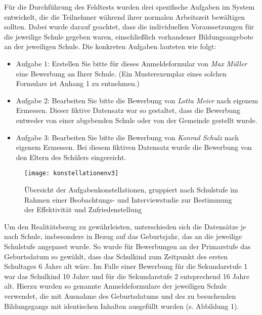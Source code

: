 Für die Durchführung des Feldtests wurden drei spezifische Aufgaben im System entwickelt, die die Teilnehmer während ihrer normalen Arbeitszeit bewältigen sollten. Dabei wurde darauf geachtet, dass die individuellen  Voraussetzungen für die jeweilige Schule gegeben waren, einschließlich  vorhandener Bildungsangebote an der jeweiligen Schule. Die konkreten Aufgaben lauteten wie folgt:

\begin{itemize}
\item Aufgabe 1: \glqq Erstellen Sie bitte für dieses Anmeldeformular von \textit{Max Müller} eine Bewerbung an Ihrer Schule.\grqq{} (Ein Musterexemplar eines solchen Formulars ist Anhang 1 zu entnehmen.)
\item Aufgabe 2: \glqq Bearbeiten Sie bitte die Bewerbung von \textit{Lotta Meier} nach eigenem Ermessen.\grqq{}  Dieser fiktive Datensatz war so gestaltet, dass die Bewerbung entweder von einer abgebenden Schule oder von der Gemeinde gestellt wurde.
\item Aufgabe 3: \glqq Bearbeiten Sie bitte die Bewerbung von \textit{Konrad Schulz} nach eigenem Ermessen.\grqq{}  Bei diesem fiktiven Datensatz wurde die Bewerbung von den Eltern des Schülers eingereicht.
\end{itemize}

\begin{figure}[H]
    \caption{Übersicht der Aufgabenkonstellationen, gruppiert nach Schulstufe im Rahmen einer Beobachtungs- und Interviewstudie zur Bestimmung der Effektivität und Zufriedenstellung}
    \texttt{[image: konstellationenv3]}
\end{figure}


Um den Realitätsbezug zu gewährleisten, unterschieden sich die Datensätze je nach Schule, insbesondere in Bezug auf das Geburtsjahr, das an die jeweilige Schulstufe angepasst wurde. So wurde für Bewerbungen an der Primarstufe das Geburtsdatum so gewählt, dass das Schulkind zum Zeitpunkt des ersten Schultages 6 Jahre alt wäre. Im Falle einer Bewerbung für die Sekundarstufe 1 war das Schulkind 10 Jahre und für die Sekundarstufe 2 entsprechend 16 Jahre alt.
Hierzu wurden so genannte Anmeldeformulare der jeweiligen Schule verwendet, die mit Ausnahme des Geburtsdatums und des zu besuchenden Bildungsgangs mit identischen Inhalten ausgefüllt wurden (s. Abbildung 1).

